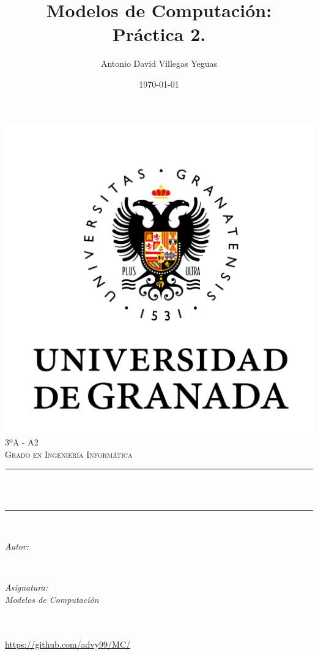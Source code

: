 \documentclass[12pt, spanish]{article}
\title{Modelos de Computación:\\
Práctica 2. \hspace{0.05cm} }
\author{Antonio David Villegas Yeguas}
\date{\today}
\makeatletter
\let\thetitle\@title
\let\theauthor\@author
\let\thedate\@date
\makeatother
\begin{document}

\begin{titlepage}
    \centering
    \vspace*{0.5 cm}
    \includegraphics[scale = 0.50]{ugr.png}\\[1.0 cm]
    \textsc{\large 3ºA - A2}\\[0.5 cm]            
    \textsc{\large Grado en Ingeniería Informática}\\[0.5 cm]              
    \rule{\linewidth}{0.2 mm} \\[0.2 cm]
    { \huge \bfseries \thetitle}\\
    \rule{\linewidth}{0.2 mm} \\[1 cm]
    
    \begin{minipage}{0.4\textwidth}
        \begin{flushleft} \large
            \emph{Autor:}\\
            \theauthor
            \end{flushleft}
            \end{minipage}~
            \begin{minipage}{0.4\textwidth}
            \begin{flushright} \large
            \emph{Asignatura: \\
            Modelos de Computación}                   
        \end{flushright}
    \end{minipage}\\[0.5cm]
  
    {\large \thedate}\\[0.5cm]
    {\url{https://github.com/advy99/MC/}}
    {\doclicenseThis}
 	
    \vfill
    
\end{titlepage}
\end{document}
